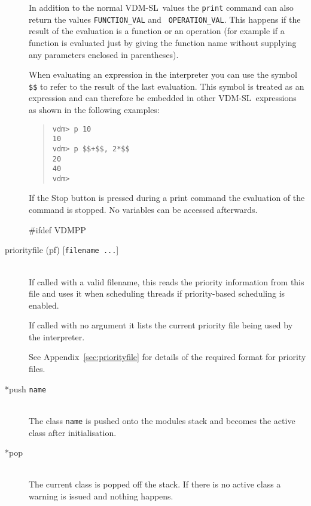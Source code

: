 \documentclass[\pformat,12pt]{article}
\newcommand{\vdmslpp}{VDM-SL}
\newcommand{\vdmslpp}{VDM++}
\newcommand{\guicmd}[1]{{\sf #1}}
\newcommand{\guicmd}[1]{{\gt #1}}
\begin{document}
\begin{description}
  In addition to the normal \vdmslpp\ values the {\tt print} command
  can also return the values {\tt FUNCTION\_VAL} and {\tt
    OPERATION\_VAL}\@.  This happens if the result of the evaluation is
  a function or an operation (for example if a function
  is evaluated just by giving the function name without supplying any
  parameters enclosed in parentheses).
  
  When evaluating an expression in the interpreter you can use the 
  symbol {\tt \$\$}\index{\$\$} to refer to the result of the last
  evaluation. This symbol is treated as an expression and can
  therefore be embedded in other \vdmslpp\ expressions as shown in
  the following examples:

\begin{quote}
\begin{verbatim}
vdm> p 10
10
vdm> p $$+$$, 2*$$
20
40
vdm> 
\end{verbatim}
\end{quote}

  If the \guicmd{Stop} button
  is pressed during a 
  print command the evaluation of the command is stopped. No variables
  can be accessed afterwards.
  
#ifdef VDMPP
\item[priorityfile (pf) \mbox{[{\tt filename ...}]}]
  \mbox{}\\
  If called with a valid filename, this reads the priority information
  from this file and uses it when scheduling threads if
  priority-based scheduling is enabled.

  If called with no argument it lists the current priority file being
  used by the interpreter.

  See Appendix~\ref{sec:priorityfile} for details of the required
  format for priority files.

\item[*push {\tt name}] \mbox{}\\
  The class {\tt name}\/ is pushed onto the modules stack and becomes
  the active class after initialisation.
  
\item[*pop] \mbox{}\\
  The current class is popped off the stack. 
If there is no active class a warning is issued and
  nothing happens.


\end{description}
\end{document}
